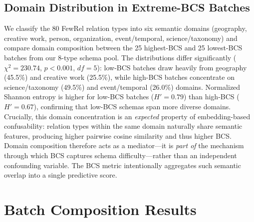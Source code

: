 \documentclass[11pt]{article}
\begin{document}
\subsection{Domain Distribution in Extreme-BCS Batches}
\label{sec:appendix_domain_distribution}

We classify the 80 FewRel relation types into six semantic domains (geography, creative work, person, organization, event/temporal, science/taxonomy) and compare domain composition between the 25 highest-BCS and 25 lowest-BCS batches from our 8-type schema pool. The distributions differ significantly ($\chi^2 = 230.74$, $p < 0.001$, $df = 5$): low-BCS batches draw heavily from geography (45.5\%) and creative work (25.5\%), while high-BCS batches concentrate on science/taxonomy (49.5\%) and event/temporal (26.0\%) domains. Normalized Shannon entropy is higher for low-BCS batches ($H' = 0.79$) than high-BCS ($H' = 0.67$), confirming that low-BCS schemas span more diverse domains. Crucially, this domain concentration is an \emph{expected} property of embedding-based confusability: relation types within the same domain naturally share semantic features, producing higher pairwise cosine similarity and thus higher BCS. Domain composition therefore acts as a mediator---it is \emph{part of} the mechanism through which BCS captures schema difficulty---rather than an independent confounding variable. The BCS metric intentionally aggregates such semantic overlap into a single predictive score.

\section{Batch Composition Results}
\label{sec:appendix_batch_composition}

\begin{table}[h]
\centering
\small
\caption{Batch composition on FewRel 80-relation RE with oracle routing. $^\dagger$Mean $\pm$ SD across 15 random seeds.}
\label{tab:batch_composition}
\end{table}
\end{document}
